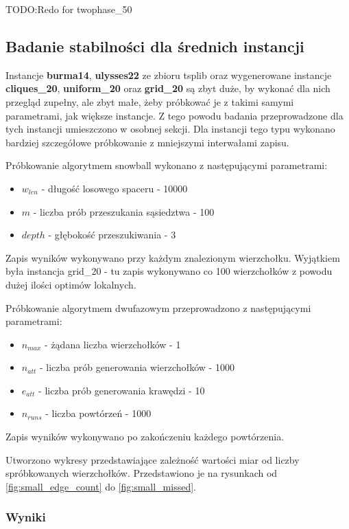 TODO:Redo for twophase\_50

\subsection{Badanie stabilności dla średnich instancji}
Instancje \textbf{burma14}, \textbf{ulysses22} ze zbioru tsplib oraz wygenerowane instancje
\textbf{cliques\_20}, \textbf{uniform\_20} oraz \textbf{grid\_20} są zbyt duże, by wykonać dla nich przegląd zupełny,
ale zbyt małe, żeby próbkować je z takimi samymi parametrami, jak większe instancje.
Z tego powodu badania przeprowadzone dla tych instancji umieszczono w osobnej sekcji.
Dla instancji tego typu wykonano bardziej szczegółowe próbkowanie z mniejszymi interwałami zapisu.

Próbkowanie algorytmem snowball wykonano z następującymi parametrami:
\begin{itemize}
    \item $w_{len}$ - długość losowego spaceru - 10000
    \item $m$ - liczba prób przeszukania sąsiedztwa - 100
    \item $depth$ - głębokość przeszukiwania - 3
\end{itemize}
Zapis wyników wykonywano przy każdym znalezionym wierzchołku.
Wyjątkiem była instancja grid\_20 - tu zapis wykonywano co 100 wierzchołków z powodu dużej ilości optimów lokalnych.

Próbkowanie algorytmem dwufazowym przeprowadzono z następującymi parametrami:
\begin{itemize}
    \item $n_{max}$ - żądana liczba wierzchołków - 1
    \item $n_{att}$ - liczba prób generowania wierzchołków - 1000
    \item $e_{att}$ - liczba prób generowania krawędzi - 10
    \item $n_{runs}$ - liczba powtórzeń - 1000
\end{itemize}
Zapis wyników wykonywano po zakończeniu każdego powtórzenia.

Utworzono wykresy przedstawiające zależność wartości miar od liczby spróbkowanych wierzchołków.
Przedstawiono je na rysunkach od \ref{fig:small_edge_count} do \ref{fig:small_missed}.

\subsubsection{Wyniki}

